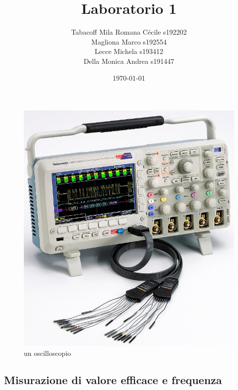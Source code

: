 \documentclass[a4paper]{article}
\begin{document}
\title{Laboratorio 1}
\author{
        Tabacoff Mila Romana Cécile s192202\\
        Magliona Marco s192554 \\
        Lecce Michela s193412\\
        Della Monica Andrea s191447}

\date{\today}
\maketitle


\begin{figure}[h]
\centering
\includegraphics[scale=0.5]{dso.jpg}
\caption{un oscilloscopio}
\end{figure}

\newpage

\begin{tcolorbox}[breakable,colback=cyan,colframe=cyan]
\section*{Misurazione di valore efficace e frequenza}
\end{tcolorbox}
\end{document}
